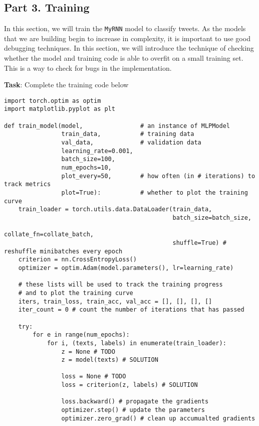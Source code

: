 \documentclass[
  letterpaper,
  DIV=11,
  numbers=noendperiod]{scrartcl}
\begin{document}
\subsection{Part 3. Training}\label{part-3.-training}

In this section, we will train the \texttt{MyRNN} model to classify
tweets. As the models that we are building begin to increase in
complexity, it is important to use good debugging techniques. In this
section, we will introduce the technique of checking whether the model
and training code is able to overfit on a small training set. This is a
way to check for bugs in the implementation.

\textbf{Task}: Complete the training code below

\begin{verbatim}
import torch.optim as optim 
import matplotlib.pyplot as plt

def train_model(model,                # an instance of MLPModel
                train_data,           # training data
                val_data,             # validation data
                learning_rate=0.001,
                batch_size=100,
                num_epochs=10,
                plot_every=50,        # how often (in # iterations) to track metrics
                plot=True):           # whether to plot the training curve
    train_loader = torch.utils.data.DataLoader(train_data,
                                               batch_size=batch_size,
                                               collate_fn=collate_batch,
                                               shuffle=True) # reshuffle minibatches every epoch
    criterion = nn.CrossEntropyLoss()
    optimizer = optim.Adam(model.parameters(), lr=learning_rate)

    # these lists will be used to track the training progress
    # and to plot the training curve
    iters, train_loss, train_acc, val_acc = [], [], [], []
    iter_count = 0 # count the number of iterations that has passed

    try:
        for e in range(num_epochs):
            for i, (texts, labels) in enumerate(train_loader):
                z = None # TODO
                z = model(texts) # SOLUTION

                loss = None # TODO
                loss = criterion(z, labels) # SOLUTION

                loss.backward() # propagate the gradients
                optimizer.step() # update the parameters
                optimizer.zero_grad() # clean up accumualted gradients


\end{verbatim}
\end{document}
